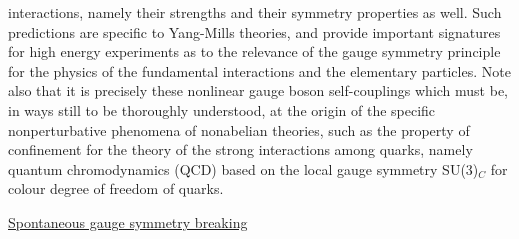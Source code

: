 \documentclass[a4paper,11pt]{article}
\begin{document}
interactions, namely their strengths and their symmetry properties as well.
Such predictions are specific to Yang-Mills theories, and provide important
signatures for high energy experiments as to the relevance of the gauge 
symmetry principle for the physics of the fundamental interactions and the
elementary particles. Note also that it is precisely these nonlinear
gauge boson self-couplings which must be, in ways still to be thoroughly
understood, at the origin of the specific nonperturbative phenomena of 
nonabelian theories, such as the property of confinement for the theory of 
the strong interactions among quarks, namely quantum chromodynamics (QCD) 
based on the local gauge symmetry SU(3)$_C$ for colour degree of freedom 
of quarks.

\vspace{10pt}

\noindent\underline{Spontaneous gauge symmetry breaking}

\vspace{5pt}
\end{document}
